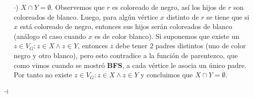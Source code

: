 \documentclass{article}
\begin{document}
\begin{enumerate}
\begin{itemize}
  \item[$\cdot$)] $X\cap Y = \emptyset$. Observemos que $r$ es coloreado
    de negro, as\'i los hijos de $r$ son coloreados de blanco. Luego,
    para alg\'un v\'ertice $x$ distinto de $r$ se tiene que si $x$ est\'a
    coloreado de negro, entonces sus hijos ser\'an coloreados de blanco
    (an\'alogo el caso cuando $x$ es de color blanco). Si suponemos que
    existe un $z \in V_G : z \in X \land z \in Y$, entonces $z$ debe tener
    $2$ padres distintos (uno de color negro y otro blanco), pero esto
    contradice a la funci\'on de parentezco, que como vimos cuando se
    mostr\'o \textbf{BFS}, a cada v\'ertice le asocia un \'unico padre.
    Por tanto no existe $z \in V_G : z \in X \land z \in Y$ y concluimos
    que $X\cap Y = \emptyset$.
    
  \end{itemize}
  \hfill $\dashv$
\end{enumerate}
\end{document}
